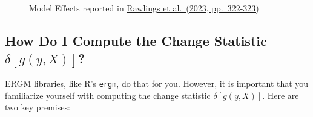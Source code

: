 \documentclass[
  letterpaper,
  DIV=11,
  numbers=noendperiod]{scrartcl}
\begin{document}
\begin{figure}
\begin{minipage}{\linewidth}
{

}

\subcaption{\label{fig-B}}

\end{minipage}%

\caption{\label{fig-model-effects}Model Effects reported in
\href{https://www.cambridge.org/core/books/network-analysis/C9202FD5420BE99225FEED4B6214DBB7}{Rawlings
et al.~(2023, pp.~322-323)}}

\end{figure}%

\subsection{\texorpdfstring{How Do I Compute the Change Statistic
\(\delta[g(y, X)]\)?}{How Do I Compute the Change Statistic \textbackslash delta{[}g(y, X){]}?}}\label{how-do-i-compute-the-change-statistic-deltagy-x}

ERGM libraries, like R's \texttt{ergm}, do that for you. However, it is
important that you familiarize yourself with computing the change
statistic \(\delta[g(y, X)]\). Here are two key premises:
\end{document}
